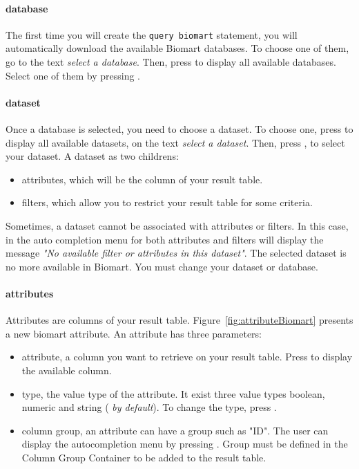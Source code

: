 \paragraph{database}
The first time you will create the \texttt{query biomart} statement, you will automatically download the available Biomart databases. To choose one of them, go to the text \textit{select a database}. Then, press \keys{\ctrl+\space} to display all available databases. Select one of them by pressing \keys{\return}. 

 
\paragraph{dataset} 
Once a database is selected, you need to choose a dataset. To choose one, press \keys{\ctrl+\space} to display all available datasets, on the text \textit{select a dataset}. Then, press \keys{\return}, to select your dataset. \newline
A dataset as two childrens:
\begin{itemize}
\item attributes, which will be the column of your result table.
\item filters, which allow you to restrict your result table for some criteria.
\end{itemize}
\begin{remark}
Sometimes, a dataset cannot be associated with attributes or filters. In this case, in the auto completion menu for both attributes and filters will display the message \textit{"No available filter or attributes in this dataset"}. The selected dataset is no more available in Biomart. You must change your dataset or database. 
\end{remark}

\paragraph{attributes}
Attributes are columns of your result table. Figure~\ref{fig:attributeBiomart} presents a new biomart attribute. An attribute has three parameters:
\begin{itemize}
\item attribute, a column you want to retrieve on your result table. Press \keys{\ctrl+\space} to display the available column.
\item type, the value type of the attribute. It exist three  value types
boolean, numeric and string (\textit{ by default}). To change the type, press \keys{\ctrl+\space}.
\item column group, an attribute can have a group such as "ID". The user can display the autocompletion menu by pressing \keys{\ctrl+\space}. Group must be defined in the Column Group Container to be added to the result table.
\end{itemize}

